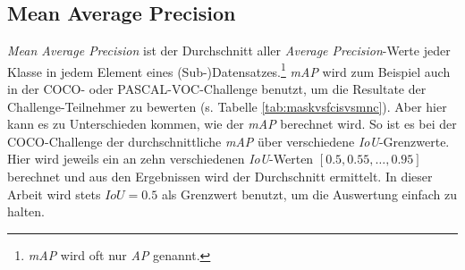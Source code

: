 \subsection{Mean Average Precision}

\textit{Mean Average Precision} ist der Durchschnitt aller \textit{Average Precision}-Werte jeder Klasse in jedem Element eines (Sub-)Datensatzes.\footnote{\textit{mAP} wird oft nur \textit{AP} genannt.} \textit{mAP} wird zum Beispiel auch in der COCO- oder PASCAL-VOC-Challenge benutzt, um die Resultate der Challenge-Teilnehmer zu bewerten (s. Tabelle \ref{tab:maskvsfcisvsmnc}). Aber hier kann es zu Unterschieden kommen, wie der \textit{mAP} berechnet wird. So ist es bei der COCO-Challenge der durchschnittliche \textit{mAP} über verschiedene \textit{IoU}-Grenzwerte. Hier wird jeweils ein  an zehn verschiedenen \textit{IoU}-Werten $[0.5, 0.55, \dots, 0.95]$ berechnet und aus den Ergebnissen wird der Durchschnitt ermittelt.\cite{ref:coco:eval} In dieser Arbeit wird stets $IoU=0.5$ als Grenzwert benutzt, um die Auswertung einfach zu halten.